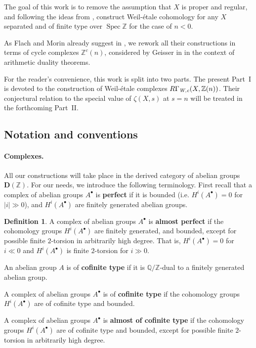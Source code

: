 \documentclass[leqno,12pt]{article}
\theoremstyle{plain}
\theoremstyle{definition}
\newtheorem{definition}[theorem]{\indent\sc Definition}
\DeclareMathOperator{\Spec}{Spec}
\newcommand{\QQ}{\mathbb{Q}}
\newcommand{\ZZ}{\mathbb{Z}}
\newcommand{\Wc}{\text{\it W,c}}
\begin{document}
The goal of this work is to remove the assumption that $X$ is proper and
regular, and following the ideas from \cite{Flach-Morin-2018}, construct
Weil-\'{e}tale cohomology for any $X$ separated and of finite type over $\Spec\ZZ$
for the case of $n < 0$.

As Flach and Morin already suggest in \cite[Remark 3.11]{Flach-Morin-2018},
we rework all their constructions in terms of cycle complexes $\ZZ^c (n)$,
considered by Geisser in \cite{Geisser-2010} in the context of arithmetic
duality theorems.

For the reader's convenience, this work is split into two parts. The present
Part~I is devoted to the construction of Weil-\'{e}tale complexes
$R\Gamma_\Wc (X, \ZZ (n))$. Their conjectural relation to the special value
of $\zeta (X,s)$ at $s = n$ will be treated in the forthcoming Part~II.

\subsection*{Notation and conventions}

\paragraph{Complexes.}
All our constructions will take place in the derived category of abelian groups
$\mathbf{D} (\ZZ)$. For our needs, we introduce the following terminology.
First recall that a complex of abelian groups $A^\bullet$ is \textbf{perfect} if
it is bounded (i.e. $H^i (A^\bullet) = 0$ for $|i| \gg 0$), and $H^i (A^\bullet)$
are finitely generated abelian groups.

\begin{definition}
  \label{dfn:almost-of-(co)finite-type}
  A complex of abelian groups $A^\bullet$ is \textbf{almost perfect}
  if the cohomology groups $H^i (A^\bullet)$ are finitely generated, and
  bounded, except for possible finite $2$-torsion in arbitrarily high degree.
  That is, $H^i (A^\bullet) = 0$ for $i \ll 0$ and $H^i (A^\bullet)$ is finite
  $2$-torsion for $i \gg 0$.

  An abelian group $A$ is of \textbf{cofinite type} if it is $\QQ/\ZZ$-dual to
  a finitely generated abelian group.

  A complex of abelian groups $A^\bullet$ is of \textbf{cofinite type} if the
  cohomology groups $H^i (A^\bullet)$ are of cofinite type and bounded.

  A complex of abelian groups $A^\bullet$ is \textbf{almost of cofinite type}
  if the cohomology groups $H^i (A^\bullet)$ are of cofinite type and
  bounded, except for possible finite $2$-torsion in arbitrarily high
  degree.
\end{definition}
\end{document}
